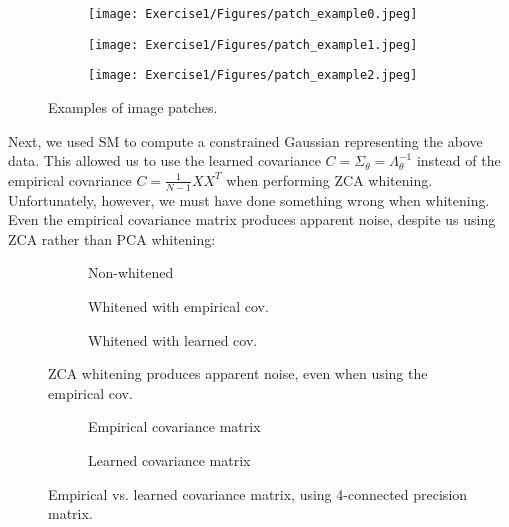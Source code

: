 \documentclass[a4paper]{article}
\theoremstyle{definition}
\theoremstyle{plain}
\begin{document}
\begin{figure}[H]
	\centering
	\begin{subfigure}[b]{0.32\textwidth}
		\centering
		\texttt{[image: Exercise1/Figures/patch\_example0.jpeg]}
	\end{subfigure}
	\hfill
	\begin{subfigure}[b]{0.32\textwidth}
		\centering
		\texttt{[image: Exercise1/Figures/patch\_example1.jpeg]}
	\end{subfigure}
	\hfill
	\begin{subfigure}[b]{0.32\textwidth}
		\centering
		\texttt{[image: Exercise1/Figures/patch\_example2.jpeg]}
	\end{subfigure}
	\caption{Examples of image patches.}
	\label{loss_SM_fig}
\end{figure}


Next, we used SM to compute a constrained Gaussian representing the above data. This allowed us to use the learned covariance $C = \Sigma_\theta = \Lambda_\theta^{-1}$ instead of the empirical covariance $C = \frac{1}{N-1} XX^T$ when performing ZCA whitening.  Unfortunately, however, we must have done something wrong when whitening. Even the empirical covariance matrix produces apparent noise, despite us using ZCA rather than PCA whitening:

\begin{figure}[H]
	\centering
	\begin{subfigure}[b]{0.32\textwidth}
		\centering
		
		\caption{Non-whitened}
	\end{subfigure}
	\hfill
	\begin{subfigure}[b]{0.32\textwidth}
		\centering
		
		\caption{Whitened with empirical cov.}
	\end{subfigure}
	\hfill
	\begin{subfigure}[b]{0.32\textwidth}
		\centering
		
		\caption{Whitened with learned cov.}
	\end{subfigure}
	\caption{ZCA whitening produces apparent noise, even when using the empirical cov.}
	\label{ex2_whitening_fig}
\end{figure}

\begin{figure}[H]
	\centering
	\begin{subfigure}[b]{0.49\textwidth}
		
		\caption{Empirical covariance matrix}
	\end{subfigure}
	\hfill
	\begin{subfigure}[b]{0.49\textwidth}
		
		\caption{Learned covariance matrix}
	\end{subfigure}
	\caption{Empirical vs. learned covariance matrix, using 4-connected precision matrix.}
	\label{ex2_covmatrices_fig}
\end{figure}
\end{document}
